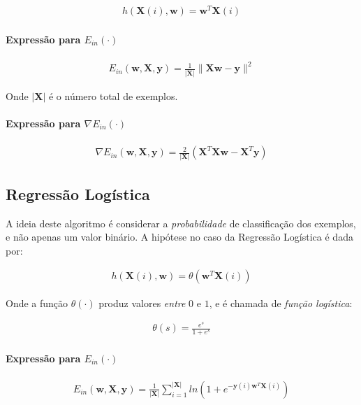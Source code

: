 \documentclass[a4paper, 12pt]{article}
\begin{document}
\begin{align*}
    h(\textbf{X}(i),\textbf{w}) = \textbf{w}^{T}\textbf{X}(i)
\end{align*}


\paragraph{Expressão para $E_{in}(\cdot)$}

\begin{align*}
    E_{in}(\textbf{w}, \textbf{X}, \textbf{y}) = \frac{1}{|\textbf{X}|} \|\textbf{Xw} - \textbf{y}\|^{2}
\end{align*}

Onde $|\textbf{X}|$ é o número total de exemplos.

\paragraph{Expressão para $\nabla{}E_{in}(\cdot)$}

\begin{align*}
    \nabla{}E_{in}(\textbf{w}, \textbf{X}, \textbf{y}) = \frac{2}{|\textbf{X}|} (\textbf{X}^{T}\textbf{Xw} - \textbf{X}^{T}\textbf{y})
\end{align*}

\subsection{Regressão Logística}

A ideia deste algoritmo é considerar a \textit{probabilidade} de classificação
dos exemplos, e não apenas um valor binário. A hipótese no caso da Regressão
Logística é dada por:

\begin{align*}
    h(\textbf{X}(i),\textbf{w}) = \theta(\textbf{w}^{T}\textbf{X}(i))
\end{align*}

Onde a função $\theta(\cdot)$ produz valores \textit{entre} $0$ e $1$, e é
chamada de \textit{função logística}:

\begin{align*}
    \theta(s) = \frac{e^{s}}{1 + e^{s}}
\end{align*}

\paragraph{Expressão para $E_{in}(\cdot)$}

\begin{align*}
    E_{in}(\textbf{w}, \textbf{X}, \textbf{y}) = \frac{1}{|\textbf{X}|} \sum^{|\textbf{X}|}_{i=1}{ln(1 + e^{-\textbf{y}(i)\textbf{w}^{T}\textbf{X}(i)})}
\end{align*}
\end{document}
